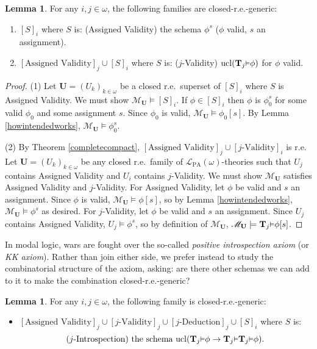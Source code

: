 \documentclass[reqno]{article}
\theoremstyle{definition}
\newtheorem{lemma}[theorem]{Lemma}
\def\L{\mathscr{L}}
\def\M{\mathscr{M}}
\def\T{\mathbf{T}}
\def\U{\mathbf{U}}
\def\LPA{\L_{\mathrm{PA}}}
\renewcommand{\Pr}[1]{\T_{#1}\mbox{\small${\vDash}$}}
\newcommand{\ucl}[1]{\mathrm{ucl}(#1)}
\begin{document}
\begin{lemma}
\label{firstutilbagvalidity}
For any $i,j\in\omega$, the following families are closed-r.e.-generic:
\begin{enumerate}
    \item
    $[S]_i$ where $S$ is: (Assigned Validity) the schema $\phi^s$ ($\phi$ valid,
    $s$ an assignment).
    \item
    $[\mbox{Assigned Validity}]_j\cup [S]_i$
    where $S$ is: ($j$-Validity) $\ucl{\Pr j \phi}$ for $\phi$ valid.
\end{enumerate}
\end{lemma}

\begin{proof}
\item
(1)
Let $\U=(U_k)_{k\in\omega}$ be a closed r.e.~superset of $[S]_i$ where $S$
is Assigned Validity.  We must show $\M_{\U}\models [S]_i$.
If $\phi\in [S]_i$ then $\phi$ is $\phi^s_0$ for some valid $\phi_0$ and
some assignment $s$.  Since $\phi_0$ is valid, $\M_{\U}\models \phi_0[s]$.
By Lemma \ref{howintendedworks}, $\M_{\U}\models \phi^s_0$.

\item
(2)
By Theorem \ref{completecompact}, $[\mbox{Assigned Validity}]_j\cup[\mbox{$j$-Validity}]_i$
is r.e.
Let $\U=(U_k)_{k\in \omega}$ be any closed r.e.~family
of $\LPA(\omega)$-theories such that $U_j$ contains Assigned Validity
and $U_i$ contains $j$-Validity.
We must show $\M_{\U}$ satisfies Assigned Validity and $j$-Validity.
For Assigned Validity, let $\phi$ be valid and $s$ an assignment.
Since $\phi$ is valid, $\M_{\U}\models\phi[s]$, so by Lemma \ref{howintendedworks},
$\M_{\U}\models\phi^s$ as desired.  For $j$-Validity,
let $\phi$ be valid and $s$ an assignment.
Since $U_j$ contains Assigned Validity, $U_j\models\phi^s$, so
by definition of $\M_{\U}$, $\M_{\U}\models \Pr j\phi[s]$.
\end{proof}

In modal logic, wars are fought over the so-called \emph{positive introspection
axiom} (or \emph{KK axiom}). Rather than join either side,
we prefer instead to study the combinatorial
structure of the axiom, asking: are there other schemas we can add to
it to make the combination closed-r.e.-generic?

\begin{lemma}
\label{firstutilbagintrospection}
For any $i,j\in\omega$, the following family is closed-r.e.-generic:
\begin{itemize}
\item $[\mbox{Assigned Validity}]_j\cup[\mbox{$j$-Validity}]_j\cup
[\mbox{$j$-Deduction}]_j\cup [S]_i$ where $S$ is:
\[\mbox{($j$-Introspection) the schema $\ucl{\Pr j\phi\rightarrow\Pr j\Pr j\phi}$.}\]
\end{itemize}
\end{lemma}
\end{document}
